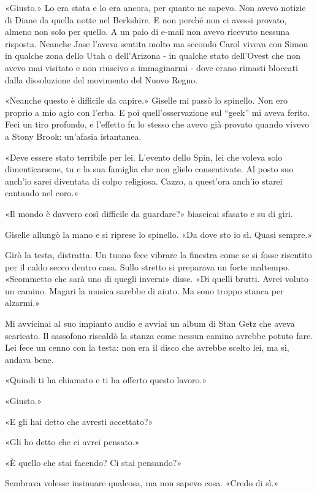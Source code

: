 «Giusto.» Lo era stata e lo era ancora, per quanto ne sapevo. Non avevo
notizie di Diane da quella notte nel Berkshire. E non perché non ci
avessi provato, almeno non solo per quello. A un paio di e-mail non
avevo ricevuto nessuna risposta. Neanche Jase l'aveva sentita molto ma
secondo Carol viveva con Simon in qualche zona dello Utah o dell'Arizona
- in qualche stato dell'Ovest che non avevo mai visitato e non riuscivo
a immaginarmi - dove erano rimasti bloccati dalla dissoluzione del
movimento del Nuovo Regno.

«Neanche questo è difficile da capire.» Giselle mi passò lo spinello.
Non ero proprio a mio agio con l'erba. E poi quell'osservazione sul
``geek'' mi aveva ferito. Feci un tiro profondo, e l'effetto fu lo
stesso che avevo già provato quando vivevo a Stony Brook: un'afasia
istantanea.

«Deve essere stato terribile per lei. L'evento dello Spin, lei che
voleva solo dimenticarsene, tu e la sua famiglia che non glielo
consentivate. Al posto suo anch'io sarei diventata di colpo religiosa.
Cazzo, a quest'ora anch'io starei cantando nel coro.»

«Il mondo è davvero così difficile da guardare?» biascicai sfasato e su
di giri.

Giselle allungò la mano e si riprese lo spinello. «Da dove sto io sì.
Quasi sempre.»

Girò la testa, distratta. Un tuono fece vibrare la finestra come se si
fosse risentito per il caldo secco dentro casa. Sullo stretto si
preparava un forte maltempo. «Scommetto che sarà uno di quegli inverni»
disse. «Di quelli brutti. Avrei voluto un camino. Magari la musica
sarebbe di aiuto. Ma sono troppo stanca per alzarmi.»

Mi avvicinai al suo impianto audio e avviai un album di Stan Getz che
aveva scaricato. Il sassofono riscaldò la stanza come nessun camino
avrebbe potuto fare. Lei fece un cenno con la testa: non era il disco
che avrebbe scelto lei, ma sì, andava bene.

«Quindi ti ha chiamato e ti ha offerto questo lavoro.»

«Giusto.»

«E gli hai detto che avresti accettato?»

«Gli ho detto che ci avrei pensato.»

«È quello che stai facendo? Ci stai pensando?»

Sembrava volesse insinuare qualcosa, ma non sapevo cosa. «Credo di sì.»

